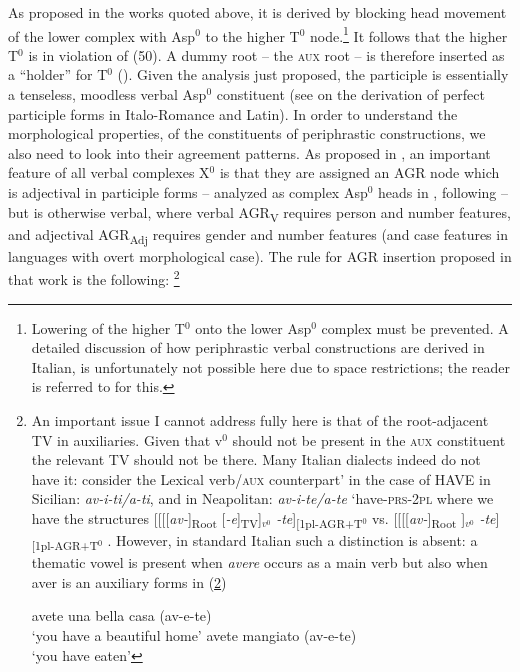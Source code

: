 \documentclass[output=paper]{langscibook}
\begin{document}
As proposed in the works quoted above, it is derived by blocking head movement of the lower complex with Asp$^0$ to the higher T$^0$ node.\footnote{Lowering of the higher T$^0$ onto the lower Asp$^0$ complex must be prevented. A detailed discussion of how periphrastic verbal constructions are derived in Italian, is unfortunately not possible here due to space restrictions; the reader is referred to \citet{calabrese2019a} for this.} It follows that the higher T$^0$ is in violation of (50).  A dummy root -- the \textsc{aux} root -- is therefore inserted as a “holder” for T$^0$ (\citealt{bjorkman2011a}). Given the analysis just proposed, the participle is essentially a tenseless, moodless verbal Asp$^0$ constituent (see \citealt{calabrese2020a} on the derivation of perfect participle forms in Italo-Romance and Latin).
In order to understand the morphological properties, of the constituents of periphrastic constructions, we also need to look into their agreement patterns.  As proposed in \citet{calabrese2019a}, an important feature of all verbal complexes X$^0$ is that they are assigned an AGR node which is adjectival in participle forms --  analyzed as complex Asp$^0$ heads in \citet{calabrese2019a}, following \citet{embick2000a, embick2004a} --  but is otherwise verbal, where verbal AGR\textsubscript{V} requires person and number features, and adjectival AGR\textsubscript{Adj} requires gender and number features (and case features in languages with overt morphological case). The rule for AGR insertion proposed in that work is the following: \footnote{An important issue I cannot address fully here is that of the root-adjacent TV in auxiliaries.  Given that v$^0$ should not be present in the \textsc{aux} constituent the relevant TV should not be there.  Many Italian dialects indeed do not have it: consider the  Lexical verb\slash \textsc{aux} counterpart’ in the case of HAVE in Sicilian: \textit{av-i-ti/a-ti}, and  in Neapolitan: \textit{av-i-te/a-te} ‘have-\textsc{prs}-\textsc{2pl} where we have the structures [[[[\textit{av-}]\textsubscript{Root} [\textit{-e}]\textsubscript{TV}]$_{v^0}$ \textit{-te}]\textsubscript{[1pl-AGR+T$^0$}  vs. [[[[\textit{av-}]\textsubscript{Root} ]$_{v^0}$ \textit{-te}]\textsubscript{[1pl-AGR+T$^0$} . However, in standard Italian such a distinction is absent: a thematic vowel is present when \textit{avere} occurs as a main verb but also when aver is an auxiliary forms in (\ref{fn38exb})

 \ea \label{fn38ex}
    \ea \label{fn38exa}avete una bella casa (av-e-te)\\
   ‘you have a beautiful home’
    \ex \label{fn38exb}avete mangiato (av-e-te)\\
   ‘you have eaten’
    \z
 \z

}
\end{document}
